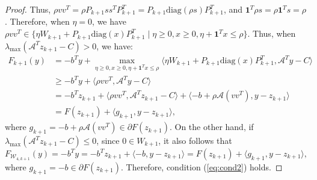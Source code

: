 \documentclass{jcmlatex}
\begin{document}
\begin{proof}
Thus, \(\rho vv^{T} = \rho P_{k+1}ss^{T}P_{k+1}^{T} = P_{k+1}\text{diag}(\rho s)P_{k+1}^{T}\), and \(\mathbf{1}^{T}\rho s = \rho\mathbf{1}^{T}s = \rho\). Therefore, when \(\eta = 0\), we have \(\rho vv^{T} \in \{\eta W_{k+1} + P_{k+1}\text{diag}(x)P_{k+1}^{T} \mid \eta \geq 0, x \geq 0, \eta + \mathbf{1}^{T}x \leq \rho\}\). Thus, when \(\lambda_{\max}(\mathcal{A}^{T}z_{k+1} - C) > 0\), we have:
\begin{equation*}
\begin{aligned}
F_{k+1}(y)&=-b^{T}y+\underset{\eta \geq 0, x \geq 0, \eta + \mathbf{1}^{T}x \leq \rho}{\max}\langle \eta W_{k+1} + P_{k+1}\text{diag}(x)P_{k+1}^{T}, \mathcal{A}^{T}y-C\rangle\\ 
&\geq -b^{T}y+\langle \rho vv^{T}, \mathcal{A}^{T}y-C\rangle\\ 
&=-b^{T}z_{k+1}+\langle \rho vv^{T}, \mathcal{A}^{T}z_{k+1}-C\rangle+\langle -b+\rho \mathcal{A}(vv^{T}),y-z_{k+1}\rangle\\ 
&=F(z_{k+1})+\langle g_{k+1},y-z_{k+1}\rangle,
\end{aligned}
\end{equation*}
where \(g_{k+1}=-b+\rho \mathcal{A}(vv^{T})\in \partial F(z_{k+1})\). On the other hand, if \(\lambda_{\max}(\mathcal{A}^{T}z_{k+1} - C) \leq 0\), since \(0 \in W_{k+1}\), it also follows that
\begin{equation*}
F_{\mathcal{W}_{4,k+1}}(y)=-b^{T}y=-b^{T}z_{k+1}+\langle -b,y-z_{k+1}\rangle =F(z_{k+1})+\langle g_{k+1},y-z_{k+1}\rangle,
\end{equation*}
where \(g_{k+1} = -b \in \partial F(z_{k+1})\). Therefore, condition (\ref{eq:cond2}) holds.


\end{proof}
\end{document}
